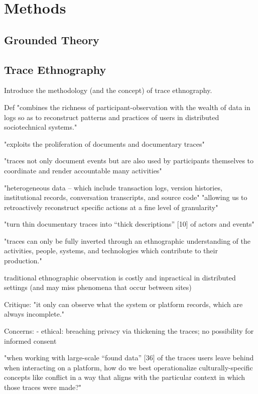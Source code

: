 \chapter{Methods}
\label{chap:methods}

\section{Grounded Theory}
\section{Trace Ethnography}

\cite{GeiRib2011}
Introduce the methodology (and the concept) of trace ethnography.

Def
"combines the richness of participant-observation
with the wealth of data in logs so as to reconstruct
patterns and practices of users in distributed
sociotechnical systems."

"exploits the proliferation of
documents and documentary traces"

"traces not only
document events but are also used by participants
themselves to coordinate and render accountable many
activities"

"heterogeneous data – which include transaction logs,
version histories, institutional records, conversation
transcripts, and source code"
"allowing us to retroactively reconstruct specific actions
at a fine level of granularity"

"turn thin documentary traces into
“thick descriptions” [10] of actors and events"

"traces can only
be fully inverted through an ethnographic
understanding of the activities, people, systems, and
technologies which contribute to their production."

traditional ethnographic observation is costly and inpractical in distributed settings (and may miss phenomena that occur between sites)

Critique:
"it only can observe what the system
or platform records, which are always incomplete."

Concerns:
- ethical: breaching privacy via thickening the traces; no possibility for informed consent

\cite{GeiHal2017}
"when working with large-scale “found data” [36] of the traces
users leave behind when interacting on a platform, how do we best operationalize culturally-specific
concepts like conflict in a way that aligns with the particular context in which those traces were made?"


